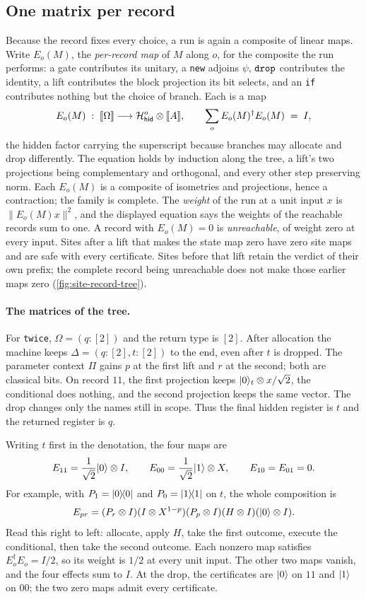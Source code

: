 \documentclass[acmsmall,screen,review,anonymous,nonacm]{acmart}
\begin{document}
\subsection{One matrix per record}\label{sec:meas:meta}

Because the record fixes every choice, a run is again a composite of linear
maps. Write $E_o(M)$, the \emph{per-record map} of $M$ along $o$, for
the composite the run performs: a gate contributes its unitary, a
\texttt{new} adjoins $\psi$, $\texttt{drop}$ contributes the identity, a lift contributes the
block projection its bit selects, and an \texttt{if} contributes nothing but
the choice of branch. Each is a map
\[
  E_o(M) \;:\; [\![\Omega]\!] \longrightarrow \mathcal{H}_{\mathsf{hid}}^{o} \otimes [\![A]\!],
  \qquad \sum_{o} E_o(M)^{\dagger} E_o(M) \;=\; I ,
\]
the hidden factor carrying the superscript because branches may allocate and
drop differently. The equation holds by induction along the tree, a lift's two
projections being complementary and orthogonal, and every other step
preserving norm. Each $E_o(M)$ is a composite of isometries and projections, hence a
contraction; the family is complete.
The \emph{weight} of the run at a
unit input $x$ is $\lVert E_o(M)x\rVert^{2}$, and the displayed equation says
the weights of the reachable records sum to one. A record with $E_o(M) = 0$ is
\emph{unreachable}, of weight zero at every input. Sites after a
lift that makes the state map zero have zero site maps and are safe with
every certificate. Sites before that lift retain the verdict of their
own prefix; the complete record being unreachable does not make those
earlier maps zero (\cref{fig:site-record-tree}).

\paragraph{The matrices of the tree.}
For \texttt{twice}, $\Omega=(q:[2])$ and the return type is $[2]$.
After allocation the machine keeps $\Delta=(q:[2],t:[2])$ to the end,
even after $t$ is dropped. The parameter context $\Pi$ gains $p$ at the first
lift and $r$ at the second; both are classical bits. On record $11$,
the first projection keeps $\lvert 0 \rangle_t\otimes x/\sqrt2$, the conditional
does nothing, and the second projection keeps the same vector.
The drop changes only the names still in scope. Thus the final hidden
register is $t$ and the returned register is $q$.

Writing $t$ first in the denotation, the four maps are
\[
 E_{11}=\frac1{\sqrt2}\lvert 0 \rangle\otimes I,\qquad
 E_{00}=\frac1{\sqrt2}\lvert 1 \rangle\otimes X,\qquad
 E_{10}=E_{01}=0.
\]
For example, with $P_1=\lvert 0 \rangle\!\langle 0 \rvert$ and $P_0=\lvert 1 \rangle\!\langle 1 \rvert$ on $t$, the whole
composition is
\[
 E_{pr}=(P_r\otimes I)(I\otimes X^{1-p})(P_p\otimes I)
         (H\otimes I)(\lvert 0 \rangle\otimes I).
\]
Read this right to left: allocate, apply $H$, take the first outcome,
execute the conditional, then take the second outcome. Each nonzero
map satisfies $E_o^{\dagger}E_o=I/2$, so its weight is $1/2$ at every
unit input. The other two maps vanish, and the four effects sum to $I$.
At the drop, the certificates are $\lvert 0 \rangle$ on $11$ and $\lvert 1 \rangle$ on $00$;
the two zero maps admit every certificate.
\end{document}
